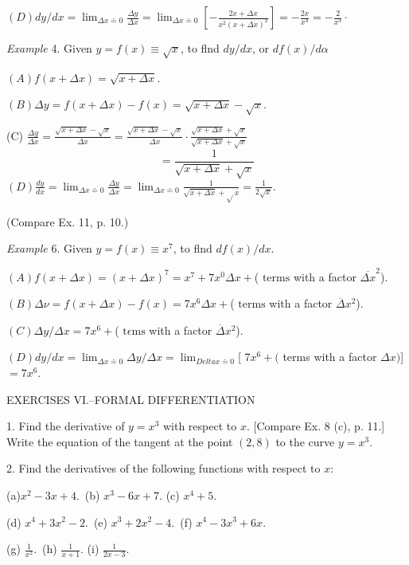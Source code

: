 \documentclass[12pt]{article}
\begin{document}
$(D) dy/dx=\lim_{\Delta x \doteq 0}\displaystyle \frac{\Delta y}{\Delta x}=
\lim_{\Delta x \doteq 0}\left[-\displaystyle \frac{2x+\Delta x}
{x^{2}(x+\Delta x)^{2}}\right]=
-\frac{2x}{x^{4}}=-\frac{2}{x^{3}}\cdot$

{\it Example} 4. Given $y=f(x)\equiv\sqrt{x}$, to flnd $dy/dx$, or $ df(x)/d\alpha$

$(A) f(x+\Delta x)=\sqrt{x+\Delta x}$.

$(B) \Delta y=f(x+\Delta x)-f(x)=\sqrt{x+\Delta x}-\sqrt{x}$.

(C) $\displaystyle \frac{\Delta y}{\Delta x}=
\frac{\sqrt{x+\Delta x}-\sqrt{x}}{\Delta x}
=\frac{\sqrt{x+\Delta x}-\sqrt{x}}{\Delta x} \cdot 
\displaystyle \frac{\sqrt{x+\Delta x}+\sqrt{x}}{\sqrt{x+\Delta x}+\sqrt{x}}$
$$
=\frac{1}{\sqrt{x+\Delta x}+\sqrt{x}}
$$
$(D) \displaystyle \frac{dy}{dx}=
\lim_{\Delta x \doteq 0}\frac{\Delta y}{\Delta x}=
\lim_{\Delta x \doteq 0}\frac{1}{\sqrt{x+\Delta x}+\sqrt{}\overline{x}}=
\frac{1}{2\sqrt{x}}$.

(Compare Ex. 11, p. 10.)

{\it Example} 6. Given $y=f(x)\equiv x^{7}$, to flnd $df(x)/dx$.

$(A) f(x+\Delta x)=(x+\Delta x)^{7}=x^{7}+7x^{0}\Delta x+$( $\mathrm{terms}$ with a factor $\overline{\Delta x}^{2}$).

$(B) \Delta\nu=f(x+\Delta x)-f(x)=7x^{6}\Delta x+$( $\mathrm{terms}$ with a factor $\overline{\Delta}x^{2}$).

$(C) \Delta y/\Delta x=7x^6+$( $\mathrm{t}\epsilon \mathrm{ms}$ with a factor $\overline{\Delta}x^{2}$).

$(D) dy/dx=\displaystyle \lim_{\Delta x \doteq 0}\Delta y/\Delta x=\lim_{Delta x \doteq 0}$[ $7x^6+($ terms with a factor $\Delta x)$] $=7x^6$.

\begin{center}
EXERCISES VI.--FORMAL DIFFERENTIATION
\end{center}

1. Find the derivative of $y=x^{3}$ with respect to $x$. [Compare Ex. 8
(c), p. 11.] Write the equation of the tangent at the point $(2, 8)$ to the
curve $y=x^3$.

2. Find the derivatives of the following functions with respect to $x$:

(a)$x^{2}-3x+4$.\ (b) $x^3-6x+7$. (c) $x^4+5$.

(d) $x^{4}+3x^{2}-2$.\ (e) $x^3+2x^{2}-4$.\ (f) $x^{4}-3x^3+6x$.

(g) $\displaystyle \frac{1}{x^{2}}$.\ 
(h) $\displaystyle \frac{1}{x+1}$. 
(i) $\displaystyle \frac{1}{2x-3}$.
\end{document}
